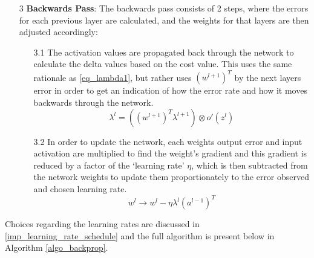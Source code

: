 \documentclass[a4paper,11pt,oneside]{article}
\theoremstyle{plain}
\theoremstyle{definition}
\begin{document}
\begin{itemize}
	\item [3] \textbf{Backwards Pass}: The backwards pass consists of 2 steps, where the errors for each previous layer are calculated, and the weights for that layers are then adjusted accordingly:
		\begin{itemize}
		\item [3.1] The activation values are propagated back through the network to calculate the delta values based on the cost value. This uses the same rationale as \eqref{eq_lambda1}, but rather uses $(w^{l+1})^T$ by the next layers error in order to get an indication of how the error rate and how it moves backwards through the network.
						\begin{equation}\label{eq_lambda4}
						\lambda^l = ((w^{l+1})^T\lambda^{l+1})  \otimes o'(z^l)
						\end{equation}
		\item [3.2] In order to update the network, each weights output error and input activation are multiplied to find the weight’s gradient and this gradient is reduced by a factor of the ‘learning rate’ $\eta$, which is then subtracted from the network weights to update them proportionately to the error observed and chosen learning rate.
						\begin{equation}\label{eq_bp_weightupdate}
						w^l \rightarrow w^l - {\eta}\lambda^{l} (a^{l - 1})^T
						\end{equation}
	\end{itemize}
		
\end{itemize}

Choices regarding the learning rates are discussed in \ref{imp_learning_rate_schedule} and the full algorithm is present below in Algorithm \ref{algo_backprop}.\newline
\end{document}
